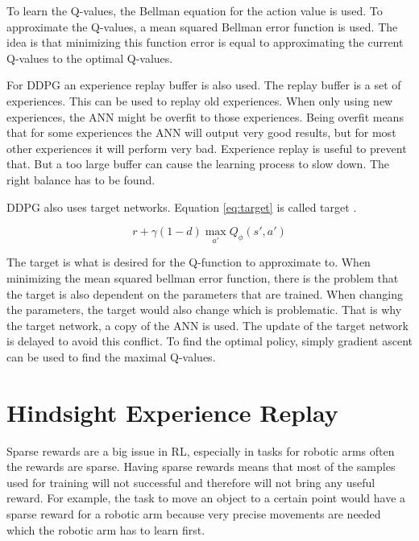 \vspace{0.5cm}

To learn the Q-values, the Bellman equation for the action value is used. To approximate the Q-values, a mean squared Bellman error function is used.
The idea is that minimizing this function error is equal to approximating the current Q-values to the optimal Q-values.

\vspace{0.5cm}

For DDPG an experience replay buffer is also used. The replay buffer is a set of experiences. This can be used to replay old experiences. When only using new experiences, the ANN might be overfit to those experiences. Being overfit means that for some experiences the ANN will output very good results, but for most other experiences it will perform very bad. Experience replay is useful to prevent that. But a too large buffer can cause the learning process to slow down. The right balance has to be found.

DDPG also uses target networks. Equation \ref{eq:target} is called target \cite{ddpg}.

\begin{equation}
\label{eq:target}
r + \gamma (1-d) \max_{a'} Q_\phi(s',a')
\end{equation}

The target is what is desired for the Q-function to approximate to.
When minimizing the mean squared bellman error function, there is the problem that the target is also dependent on the parameters that are trained. When changing the parameters, the target would also change which is problematic. That is why the target network, a copy of the ANN is used. The update of the target network is delayed to avoid this conflict.
To find the optimal policy, simply gradient ascent can be used to find the maximal Q-values.


\section{Hindsight Experience Replay}


Sparse rewards are a big issue in RL, especially in tasks for robotic arms often the rewards are sparse. Having sparse rewards means that most of the samples used for training will not successful and therefore will not bring any useful reward. For example, the task to move an object to a certain point would have a sparse reward for a robotic arm because very precise movements are needed which the robotic arm has to learn first.
 
